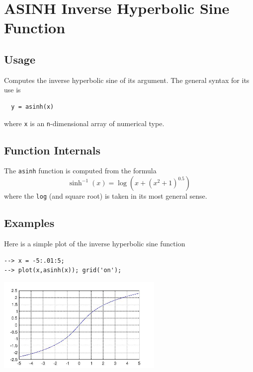 \section{ASINH Inverse Hyperbolic Sine Function}

\subsection{Usage}

Computes the inverse hyperbolic sine of its argument.  The general
syntax for its use is
\begin{verbatim}
  y = asinh(x)
\end{verbatim}
where \verb|x| is an \verb|n|-dimensional array of numerical type.
\subsection{Function Internals}

The \verb|asinh| function is computed from the formula
\[
   \sinh^{-1}(x) = \log\left(x + (x^2 + 1)^0.5\right)
\]
where the \verb|log| (and square root) is taken in its most general sense.
\subsection{Examples}

Here is a simple plot of the inverse hyperbolic sine function
\begin{verbatim}
--> x = -5:.01:5;
--> plot(x,asinh(x)); grid('on');
\end{verbatim}


\centerline{\includegraphics[width=8cm]{asinhplot}}

